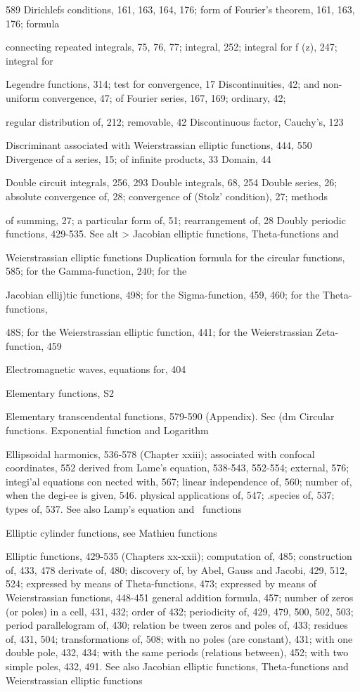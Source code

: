 589
Dirichlefs conditions, 161, 163, 164, 176; form of Fourier's theorem, 161, 163, 176; formula

connecting repeated integrals, 75, 76, 77; integral, 252; integral for f (z), 247; integral for

Legendre functions, 314; test for convergence, 17
Discontinuities, 42; and non-uniform convergence, 47; of Fourier series, 167, 169; ordinary, 42;

regular distribution of, 212; removable, 42
Discontinuous factor, Cauchy's, 123

Discriminant associated with Weierstrassian elliptic functions, 444, 550
Divergence of a series, 15; of infinite products, 33
Domain, 44

Double circuit integrals, 256, 293
Double integrals, 68, 254
Double series, 26; absolute convergence of, 28; convergence of (Stolz' condition), 27; methods

of summing, 27; a particular form of, 51; rearrangement of, 28
Doubly periodic functions, 429-535. See alt > Jacobian elliptic functions, Theta-functions and

Weierstrassian elliptic functions
Duplication formula for the circular functions, 585; for the Gamma-function, 240; for the

Jacobian ellij)tic functions, 498; for the Sigma-function, 459, 460; for the Theta-functions,

48S; for the Weierstrassian elliptic function, 441; for the Weierstrassian Zeta-function, 459

Electromagnetic waves, equations for, 404

Elementary functions, S2

Elementary transcendental functions, 579-590 (Appendix). Sec (dm Circular functions.
Exponential function and Logarithm

Ellipsoidal harmonics, 536-578 (Chapter xxiii); associated with confocal coordinates, 552
derived from Lame's equation, 538-543, 552-554; external, 576; integi'al equations con
nected with, 567; linear independence of, 560; number of, when the degi-ee is given, 546.
physical applications of, 547; .species of, 537; types of, 537. See also Lamp's equation
and \Lame\ functions

Elliptic cylinder functions, see Mathieu functions

Elliptic functions, 429-535 (Chapters xx-xxii); computation of, 485; construction of, 433, 478
derivate of, 480; discovery of, by Abel, Gauss and Jacobi, 429, 512, 524; expressed by
means of Theta-functions, 473; expressed by means of Weierstrassian functions, 448-451
general addition formula, 457; number of zeros (or poles) in a cell, 431, 432; order of
432; periodicity of, 429, 479, 500, 502, 503; period parallelogram of, 430; relation be
tween zeros and poles of, 433; residues of, 431, 504; transformations of, 508; with no
poles (are constant), 431; with one double pole, 432, 434; with the same periods (relations
between), 452; with two simple poles, 432, 491. See also Jacobian elliptic functions,
Theta-functions and Weierstrassian elliptic functions

